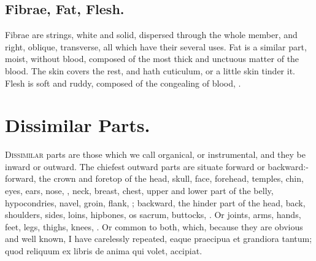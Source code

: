 {\subsection{Fibrae, Fat, Flesh.}
Fibrae are strings, white and solid, dispersed
through the whole member, and right, oblique, transverse, all which
have their several uses. Fat is a similar part, moist, without blood,
composed of the most thick and unctuous matter of the blood. The
skin covers the rest, and hath cuticulum, or a little skin tinder
it. Flesh is soft and ruddy, composed of the congealing of blood, \etc{}.

\section{Dissimilar Parts.}

\lettrine{D}{issimilar} parts are those which we call organical, or instrumental,
and they be inward or outward. The chiefest outward parts are situate
forward or backward:-forward, the crown and foretop of the head, skull,
face, forehead, temples, chin, eyes, ears, nose, \etc{}, neck, breast,
chest, upper and lower part of the belly, hypocondries, navel, groin,
flank, \etc{}; backward, the hinder part of the head, back, shoulders,
sides, loins, hipbones, os sacrum, buttocks, \etc{}. Or joints, arms,
hands, feet, legs, thighs, knees, \etc{}. Or common to both, which, because
they are obvious and well known, I have carelessly repeated, eaque
praecipua et grandiora tantum; quod reliquum ex libris de anima qui
volet, accipiat.

}
